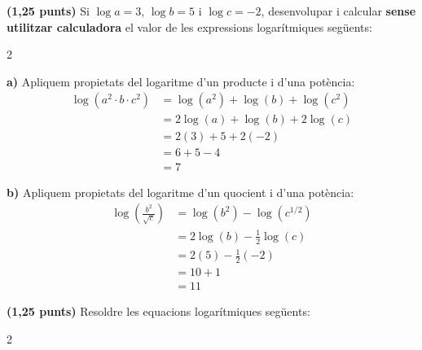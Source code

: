 \documentclass[12pt,a4paper]{exam}
\begin{document}
\begin{questions}
\question \textbf{(1,25 punts)} Si $\log a=3$, $\log b=5$ i $\log c=-2$, desenvolupar i calcular \textbf{sense utilitzar calculadora} el valor de les expressions logarítmiques següents:
\begin{multicols}{2}
\end{multicols}
\begin{solution}
    \textbf{a)} Apliquem propietats del logaritme d'un producte i d'una potència:
    \begin{align*}
        \log(a^{2}\cdot b\cdot c^{2}) &= \log(a^2) + \log(b) + \log(c^2) \\
        &= 2\log(a) + \log(b) + 2\log(c) \\
        &= 2(3) + 5 + 2(-2) \\
        &= 6 + 5 - 4 \\
        &\boxed{= 7}
    \end{align*}
    
    \textbf{b)} Apliquem propietats del logaritme d'un quocient i d'una potència:
    \begin{align*}
        \log\left(\frac{b^{2}}{\sqrt{c}}\right) &= \log(b^2) - \log(c^{1/2}) \\
        &= 2\log(b) - \frac{1}{2}\log(c) \\
        &= 2(5) - \frac{1}{2}(-2) \\
        &= 10 + 1 \\
        &\boxed{= 11}
    \end{align*}
\end{solution}

\question \textbf{(1,25 punts)} Resoldre les equacions logarítmiques següents:
\begin{multicols}{2}
\end{multicols}
\end{questions}
\end{document}
